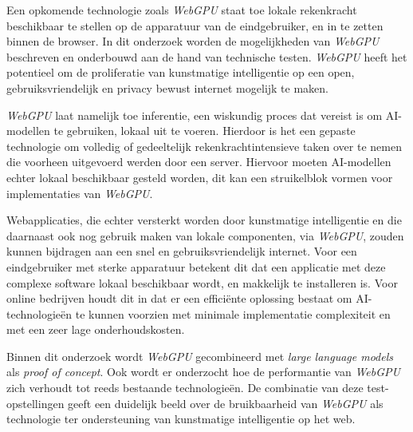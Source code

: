 \bigbreak{}

Een opkomende technologie zoals \textit{WebGPU} staat toe lokale rekenkracht beschikbaar te stellen op de apparatuur van de eindgebruiker, en in te zetten binnen de browser. In dit onderzoek worden de mogelijkheden van \textit{WebGPU} beschreven en onderbouwd aan de hand van technische testen. \textit{WebGPU} heeft het potentieel om de proliferatie van kunstmatige intelligentie op een open, gebruiksvriendelijk en privacy bewust internet mogelijk te maken.

\bigbreak{}

\textit{WebGPU} laat namelijk toe inferentie, een wiskundig proces dat vereist is om AI-modellen te gebruiken, lokaal uit te voeren. Hierdoor is het een gepaste technologie om volledig of gedeeltelijk rekenkrachtintensieve taken over te nemen die voorheen uitgevoerd werden door een server. Hiervoor moeten AI-modellen echter lokaal beschikbaar gesteld worden, dit kan een struikelblok vormen voor implementaties van \textit{WebGPU}.

\bigbreak{}

Webapplicaties, die echter versterkt worden door kunstmatige intelligentie en die daarnaast ook nog gebruik maken van lokale componenten, via \textit{WebGPU}, zouden kunnen bijdragen aan een snel en gebruiksvriendelijk internet. Voor een eindgebruiker met sterke apparatuur betekent dit dat een applicatie met deze complexe software lokaal beschikbaar wordt, en makkelijk te installeren is. Voor online bedrijven houdt dit in dat er een efficiënte oplossing bestaat om AI-tech\-no\-lo\-gieën te kunnen voorzien met minimale implementatie complexiteit en met een zeer lage onderhoudskosten.

\bigbreak{}

Binnen dit onderzoek wordt \textit{WebGPU} gecombineerd met \textit{large language models} als \textit{proof of concept}. Ook wordt er onderzocht hoe de performantie van \textit{WebGPU} zich verhoudt tot reeds bestaande technologieën. De combinatie van deze test-op\-ste\-llingen geeft een duidelijk beeld over de bruikbaarheid van \textit{WebGPU} als technologie ter ondersteuning van kunstmatige intelligentie op het web.